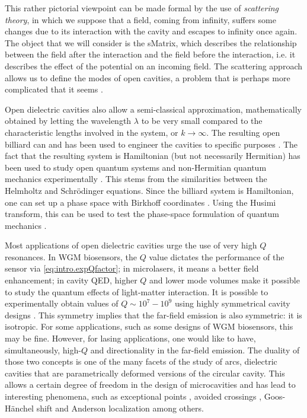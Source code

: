 This rather pictorial viewpoint can be made formal by the use of \textit{scattering theory}, 
in which we suppose that a field, coming from infinity, suffers some changes due to its
interaction with the cavity and escapes to infinity once again. The object that we will consider
is the \gls{sMatrix}, which describes the relationship between the field after the interaction
and the field before the interaction, i.e. it describes the effect of the potential
on an incoming field. The scattering approach allows us to define the modes of 
open cavities, a problem that is perhaps more complicated that it seems \cite{DUT2000,DUT2001,TUR2005}.

Open dielectric cavities also allow a semi-classical approximation, mathematically
obtained by letting the wavelength $\lambda$ to be very small compared to 
the characteristic lengths involved in the system, or $k\rightarrow\infty$. 
The resulting open billiard can and has been used to engineer the cavities
to specific purposes \cite{KIM2013}. The fact
that the resulting system is Hamiltonian (but not necessarily Hermitian) 
has been used to study open quantum systems and non-Hermitian quantum 
mechanics experimentally \cite{BIT2010,XIA2012,ALT2013,KWO2013,LED2013,LOB2013,XIA2013}. This stems from the similarities between the
Helmholtz and Schrödinger equations. Since the billiard system is Hamiltonian, 
one can set up a phase space with Birkhoff coordinates \cite{BIR1927,ROB1999}. 
Using the Husimi \cite{LEE1995} transform, this can be used to test
the phase-space formulation of quantum mechanics \cite{ZUR2003}.

Most applications of open dielectric cavities urge the use of very high $Q$
resonances. In WGM biosensors, the $Q$ value dictates the performance
of the sensor via \eqref{eq:intro.expQfactor}; in microlasers, it means a better field enhancement; in cavity
QED, higher $Q$ and lower mode volumes make it possible to study the quantum 
effects of light-matter interaction. It is possible to experimentally obtain
values of $Q\sim10^7-10^9$ using highly symmetrical cavity designs \cite{ARM2003,ARM2007,WAR2011}.
This symmetry implies that the far-field emission is also symmetric: it is
isotropic. For some applications, such as some designs of WGM biosensors, this may be
fine. However, for lasing applications, one would like to have, simultaneously, 
high-$Q$ and directionality in the far-field emission. The duality of those 
two concepts is one of the many facets of the study of \glspl{arc}, dielectric
cavities that are parametrically deformed versions of the circular cavity. 
This allows a certain degree of freedom in the design of microcavities and has
lead to interesting phenomena, such as exceptional points \cite{DET2009,RYU2009,HEI2012,BIT2014}, 
avoided crossings \cite{SON2013}, Goos-Hänchel shift \cite{UNT2008} and Anderson
localization \cite{AND2010} among others.

